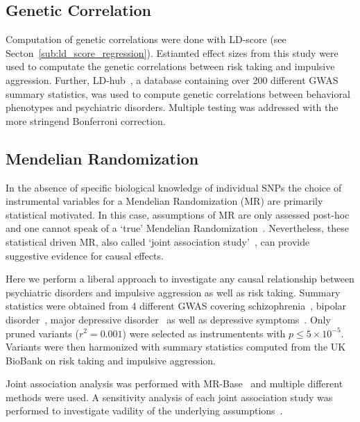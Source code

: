 \subsection*{Genetic Correlation}
\label{sub:genetic_correlation}

Computation of genetic correlations were done with LD-score (see Secton~\ref{sub:ld_score_regression}).
Estiamted effect sizes from this study were used to computate the genetic correlations between risk taking and impulsive aggression.
Further, LD-hub~\cite{ZHENG2016}, a database containing over 200 different GWAS summary statistics, was used to compute genetic correlations between behavioral phenotypes and psychiatric disorders.
Multiple testing was addressed with the more stringend Bonferroni correction.

\subsection*{Mendelian Randomization}
\label{sub:joint_association_study}

In the absence of specific biological knowledge of individual SNPs the choice of instrumental variables for a Mendelian Randomization (MR) are primarily statistical motivated.
In this case, assumptions of MR are only assessed post-hoc and one cannot speak of a `true' Mendelian Randomization~\cite{Burgess2016a}.
Nevertheless, these statistical driven MR, also called `joint association study'~\cite{Burgess2016a}, can provide suggestive evidence for causal effects.

Here we perform a liberal approach to investigate any causal relationship between psychiatric disorders and impulsive aggression as well as risk taking.
Summary statistics were obtained from 4 different GWAS covering schizophrenia~\cite{Ripke2014}, bipolar disorder~\cite{PsychiatricGWASConsortiumBipolarDisorderWorkingGroup2011}, major depressive disorder~\cite{MajorDepressiveDisorderWorkingGroupofthePsychiatricGWASConsortium2013} as well as depressive symptoms~\cite{Okbay2016a}.
Only pruned variants ($r^2=0.001$) were selected as instrumentents with $p\leq 5\times 10^{-5}$.
Variants were then harmonized with summary statistics computed from the UK BioBank on risk taking and impulsive aggression. 

Joint association analysis was performed with MR-Base~\cite{Hemani2016} and multiple different methods were used.
A sensitivity analysis of each joint association study was performed to investigate vadility of the underlying assumptions~\cite{Burgess2016}.  
